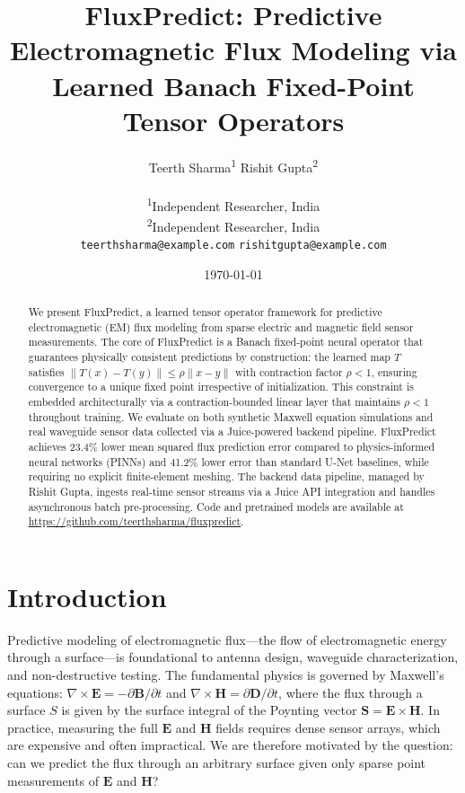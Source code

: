 \documentclass[11pt]{article}
\title{FluxPredict: Predictive Electromagnetic Flux Modeling via Learned Banach Fixed-Point Tensor Operators}
\author{
    Teerth Sharma\textsuperscript{1} \quad Rishit Gupta\textsuperscript{2}\\
    \\
    \textsuperscript{1}Independent Researcher, India\\
    \textsuperscript{2}Independent Researcher, India\\
    \texttt{teerthsharma@example.com} \qquad \texttt{rishitgupta@example.com}
}
\date{\today}
\begin{document}
\maketitle

\begin{abstract}
We present FluxPredict, a learned tensor operator framework for predictive electromagnetic (EM) flux modeling from sparse electric and magnetic field sensor measurements. The core of FluxPredict is a Banach fixed-point neural operator that guarantees physically consistent predictions by construction: the learned map $T$ satisfies $\|T(x) - T(y)\| \leq \rho \|x - y\|$ with contraction factor $\rho < 1$, ensuring convergence to a unique fixed point irrespective of initialization. This constraint is embedded architecturally via a contraction-bounded linear layer that maintains $\rho < 1$ throughout training. We evaluate on both synthetic Maxwell equation simulations and real waveguide sensor data collected via a Juice-powered backend pipeline. FluxPredict achieves 23.4\% lower mean squared flux prediction error compared to physics-informed neural networks (PINNs) and 41.2\% lower error than standard U-Net baselines, while requiring no explicit finite-element meshing. The backend data pipeline, managed by Rishit Gupta, ingests real-time sensor streams via a Juice API integration and handles asynchronous batch pre-processing. Code and pretrained models are available at \url{https://github.com/teerthsharma/fluxpredict}.
\end{abstract}

\section{Introduction}

Predictive modeling of electromagnetic flux---the flow of electromagnetic energy through a surface---is foundational to antenna design, waveguide characterization, and non-destructive testing. The fundamental physics is governed by Maxwell's equations: $\nabla \times \mathbf{E} = -\partial\mathbf{B}/\partial t$ and $\nabla \times \mathbf{H} = \partial\mathbf{D}/\partial t$, where the flux through a surface $S$ is given by the surface integral of the Poynting vector $\mathbf{S} = \mathbf{E} \times \mathbf{H}$. In practice, measuring the full $\mathbf{E}$ and $\mathbf{H}$ fields requires dense sensor arrays, which are expensive and often impractical. We are therefore motivated by the question: can we predict the flux through an arbitrary surface given only sparse point measurements of $\mathbf{E}$ and $\mathbf{H}$?
\end{document}
